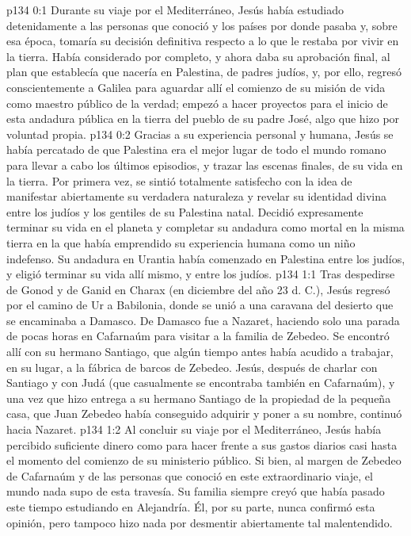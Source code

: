 \author{Comisión de seres intermedios}
\vs p134 0:1 Durante su viaje por el Mediterráneo, Jesús había estudiado detenidamente a las personas que conoció y los países por donde pasaba y, sobre esa época, tomaría su decisión definitiva respecto a lo que le restaba por vivir en la tierra. Había considerado por completo, y ahora daba su aprobación final, al plan que establecía que nacería en Palestina, de padres judíos, y, por ello, regresó conscientemente a Galilea para aguardar allí el comienzo de su misión de vida como maestro público de la verdad; empezó a hacer proyectos para el inicio de esta andadura pública en la tierra del pueblo de su padre José, algo que hizo por voluntad propia.
\vs p134 0:2 Gracias a su experiencia personal y humana, Jesús se había percatado de que Palestina era el mejor lugar de todo el mundo romano para llevar a cabo los últimos episodios, y trazar las escenas finales, de su vida en la tierra. Por primera vez, se sintió totalmente satisfecho con la idea de manifestar abiertamente su verdadera naturaleza y revelar su identidad divina entre los judíos y los gentiles de su Palestina natal. Decidió expresamente terminar su vida en el planeta y completar su andadura como mortal en la misma tierra en la que había emprendido su experiencia humana como un niño indefenso. Su andadura en Urantia había comenzado en Palestina entre los judíos, y eligió terminar su vida allí mismo, y entre los judíos.
\vs p134 1:1 Tras despedirse de Gonod y de Ganid en Charax (en diciembre del año 23 d. C.), Jesús regresó por el camino de Ur a Babilonia, donde se unió a una caravana del desierto que se encaminaba a Damasco. De Damasco fue a Nazaret, haciendo solo una parada de pocas horas en Cafarnaúm para visitar a la familia de Zebedeo. Se encontró allí con su hermano Santiago, que algún tiempo antes había acudido a trabajar, en su lugar, a la fábrica de barcos de Zebedeo. Jesús, después de charlar con Santiago y con Judá (que casualmente se encontraba también en Cafarnaúm), y una vez que hizo entrega a su hermano Santiago de la propiedad de la pequeña casa, que Juan Zebedeo había conseguido adquirir y poner a su nombre, continuó hacia Nazaret.
\vs p134 1:2 Al concluir su viaje por el Mediterráneo, Jesús había percibido suficiente dinero como para hacer frente a sus gastos diarios casi hasta el momento del comienzo de su ministerio público. Si bien, al margen de Zebedeo de Cafarnaúm y de las personas que conoció en este extraordinario viaje, el mundo nada supo de esta travesía. Su familia siempre creyó que había pasado este tiempo estudiando en Alejandría. Él, por su parte, nunca confirmó esta opinión, pero tampoco hizo nada por desmentir abiertamente tal malentendido.
